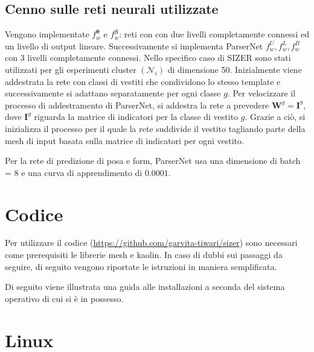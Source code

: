 \subsection{Cenno sulle reti neurali utilizzate}

\medskip

Vengono implementate $f_{w}^{\boldsymbol{\theta}}$ e $f_{w}^{\boldsymbol{\beta}}$: reti con con due livelli completamente connessi ed un livello di output lineare. Successivamente si implementa ParserNet $f_{w}^{U}, f_{w}^{L}, f_{w}^{B}$ con 3 livelli completamente connessi. Nello specifico caso di SIZER sono stati utilizzati per gli esperimenti cluster $\left(\mathcal{N}_{i}\right)$ di dimensione 50. 
Inizialmente viene addestrata la rete con classi di vestiti che condividono lo stesso template e successivamente si adattano separatamente per ogni classe $g$.
Per velocizzare il processo di addestramento di ParserNet, si addestra la rete a prevedere $\mathbf{W}^{g}=\mathbf{I}^{g}$, dove $\mathbf{I}^{g}$ riguarda la matrice di indicatori per la classe di vestito $g$.
Grazie a ciò, si inizializza il processo per il quale la rete suddivide il vestito tagliando parte della mesh di input basata sulla matrice di indicatori per ogni vestito.

\medskip

Per la rete di predizione di posa e form, ParserNet usa una dimensione di batch = 8 e una curva di apprendimento di $0.0001$.






\newpage

\section{Codice}

\medskip

Per utilizzare il codice (\url{https://github.com/garvita-tiwari/sizer}) sono necessari come prerequisiti le librerie mesh e kaolin.
In caso di dubbi sui passaggi da seguire, di seguito vengono riportate le istruzioni in maniera semplificata.

\medskip

Di seguito viene illustrata una guida alle installazioni a seconda del sistema operativo di cui si è in possesso.

\medskip

\section{Linux}

